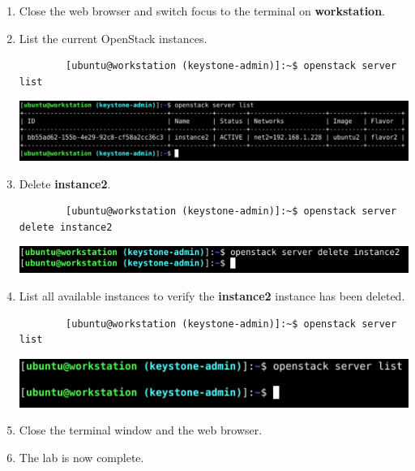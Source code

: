 \documentclass[letterpaper, 12pt]{article}
\begin{document}
\begin{enumerate}
    \item Close the web browser and switch focus to the terminal on \textbf{workstation}.

    \item List the current OpenStack instances.
    \begin{lstlisting}
        [ubuntu@workstation (keystone-admin)]:~$ openstack server list
    \end{lstlisting}

    \begin{center}
        \includegraphics[width=\linewidth]{images/part5/step12.png}
    \end{center}

    \item Delete \textbf{instance2}.
    \begin{lstlisting}
        [ubuntu@workstation (keystone-admin)]:~$ openstack server delete instance2
    \end{lstlisting}

    \begin{center}
        \includegraphics[width=\linewidth]{images/part5/step13.png}
    \end{center}

    \item List all available instances to verify the \textbf{instance2} instance has been deleted.
    \begin{lstlisting}
        [ubuntu@workstation (keystone-admin)]:~$ openstack server list
    \end{lstlisting}

    \begin{center}
        \includegraphics[width=\linewidth]{images/part5/step14.png}
    \end{center}

    \item Close the terminal window and the web browser.
    
    \item The lab is now complete.

\end{enumerate}
\end{document}
